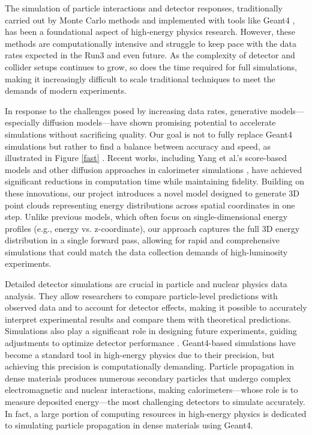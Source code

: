 The simulation of particle interactions and detector responses, traditionally carried out by Monte Carlo methods and implemented with tools like Geant4 \cite{Geant4}, has been a foundational aspect of high-energy physics research. However, these methods are computationally intensive and struggle to keep pace with the data rates expected in the Run3 and even future. As the complexity of detector and collider setups continues to grow, so does the time required for full simulations, making it increasingly difficult to scale traditional techniques to meet the demands of modern experiments.

In response to the challenges posed by increasing data rates, generative models—especially diffusion models—have shown promising potential to accelerate simulations without sacrificing quality. Our goal is not to fully replace Geant4 simulations but rather to find a balance between accuracy and speed, as illustrated in Figure \ref{fast} . Recent works, including Yang et al.'s score-based models \cite{song2020} and other diffusion approaches in calorimeter simulations \cite{mikuni2021}, have achieved significant reductions in computation time while maintaining fidelity. Building on these innovations, our project introduces a novel model designed to generate 3D point clouds representing energy distributions across spatial coordinates in one step. Unlike previous models, which often focus on single-dimensional energy profiles (e.g., energy vs. z-coordinate), our approach captures the full 3D energy distribution in a single forward pass, allowing for rapid and comprehensive simulations that could match the data collection demands of high-luminosity experiments.

Detailed detector simulations are crucial in particle and nuclear physics data analysis. They allow researchers to compare particle-level predictions with observed data and to account for detector effects, making it possible to accurately interpret experimental results and compare them with theoretical predictions. Simulations also play a significant role in designing future experiments, guiding adjustments to optimize detector performance \cite{geant1, geant2}. Geant4-based simulations \cite{geant3} have become a standard tool in high-energy physics due to their precision, but achieving this precision is computationally demanding. Particle propagation in dense materials produces numerous secondary particles that undergo complex electromagnetic and nuclear interactions, making calorimeters—whose role is to measure deposited energy—the most challenging detectors to simulate accurately. In fact, a large portion of computing resources in high-energy physics is dedicated to simulating particle propagation in dense materials using Geant4.

